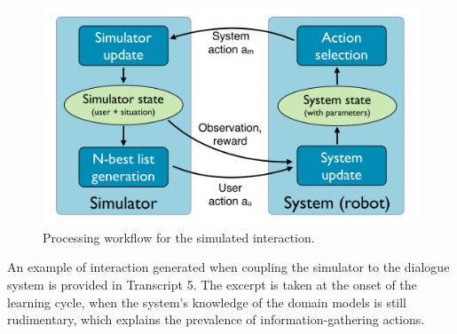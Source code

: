 \begin{figure}[ht]
\begin{center}
\includegraphics[scale=0.3]{imgs/exp2_architecture.pdf}
\end{center} 
\caption{Processing workflow for the simulated interaction.}
\label{fig:exp2_architecture}
\end{figure}

An example of interaction generated when coupling the simulator to the dialogue system is provided in Transcript 5. The excerpt is taken at the onset of the learning cycle, when the system's knowledge of the domain models is still rudimentary, which explains the prevalence of information-gathering actions. 

